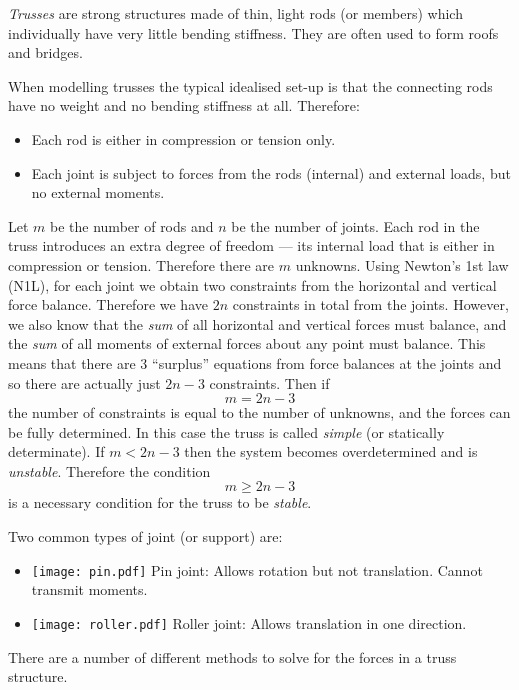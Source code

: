{\em Trusses} are strong structures made of thin, light rods (or members) which individually have very little bending stiffness. They are often used to form roofs and bridges.

When modelling trusses the typical idealised set-up is that the connecting rods have no weight and no bending stiffness at all. Therefore:
\begin{itemize}
 \item Each rod is either in compression or tension only.
 \item Each joint is subject to forces from the rods (internal) and external loads, but no external moments.
\end{itemize}

Let $m$ be the number of rods and $n$ be the number of joints. Each rod in the truss introduces an extra degree of freedom --- its internal load that is either in compression or tension. Therefore there are $m$ unknowns. Using Newton's 1st law (N1L), for each joint we obtain two constraints from the horizontal and vertical force balance. Therefore we have $2n$ constraints in total from the joints. However, we also know that the {\em sum} of all horizontal and vertical forces must balance, and the {\em sum} of all moments of external forces about any point must balance. This means that there are 3 ``surplus'' equations from force balances at the joints and so there are actually just $2n-3$ constraints. Then if
\[
 m=2n-3
\]
the number of constraints is equal to the number of unknowns, and the forces can be fully determined. In this case the truss is called {\em simple} (or statically determinate). If $m<2n-3$ then the system becomes overdetermined and is {\em unstable}. Therefore the condition
\[
 m\geq 2n-3
\]
is a necessary condition for the truss to be {\em stable}.

Two common types of joint (or support) are:
\begin{itemize}
 \item \texttt{[image: pin.pdf]} Pin joint: Allows rotation but not translation. Cannot transmit moments.
 \item \texttt{[image: roller.pdf]} Roller joint: Allows translation in one direction.
\end{itemize}

There are a number of different methods to solve for the forces in a truss structure. 

